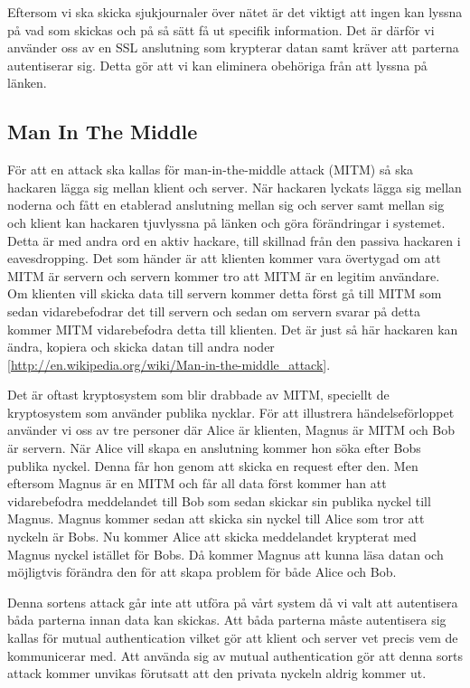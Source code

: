Eftersom vi ska skicka sjukjournaler över nätet är det viktigt att ingen kan lyssna på vad som skickas och på så sätt få ut specifik information. Det är därför vi använder oss av en SSL anslutning som krypterar datan samt kräver att parterna autentiserar sig. Detta gör att vi kan eliminera obehöriga från att lyssna på länken. 

\subsection{Man In The Middle}

För att en attack ska kallas för man-in-the-middle attack (MITM) så ska hackaren lägga sig mellan klient och server. När hackaren lyckats lägga sig mellan noderna och fått en etablerad anslutning mellan sig och server samt mellan sig och klient kan hackaren tjuvlyssna på länken och göra förändringar i systemet. Detta är med andra ord en aktiv hackare, till skillnad från den passiva hackaren i eavesdropping. Det som händer är att klienten kommer vara övertygad om att MITM är servern och servern kommer tro att MITM är en legitim användare. Om klienten vill skicka data till servern kommer detta först gå till MITM som sedan vidarebefodrar det till servern och sedan om servern svarar på detta kommer MITM vidarebefodra detta till klienten. Det är just så här hackaren kan ändra, kopiera och skicka datan till andra noder [\url{http://en.wikipedia.org/wiki/Man-in-the-middle_attack}].

Det är oftast kryptosystem som blir drabbade av MITM, speciellt de kryptosystem som använder publika nycklar. För att illustrera händelseförloppet använder vi oss av tre personer där Alice är klienten, Magnus är MITM och Bob är servern. När Alice vill skapa en anslutning kommer hon söka efter Bobs publika nyckel. Denna får hon genom att skicka en request efter den. Men eftersom Magnus är en MITM och får all data först kommer han att vidarebefodra meddelandet till Bob som sedan skickar sin publika nyckel till Magnus. Magnus kommer sedan att skicka sin nyckel till Alice som tror att nyckeln är Bobs. Nu kommer Alice att skicka meddelandet krypterat med Magnus nyckel istället för Bobs. Då kommer Magnus att kunna läsa datan och möjligtvis förändra den för att skapa problem för både Alice och Bob. 

Denna sortens attack går inte att utföra på vårt system då vi valt att autentisera båda parterna innan data kan skickas. Att båda parterna måste autentisera sig kallas för mutual authentication vilket gör att klient och server vet precis vem de kommunicerar med. Att använda sig av mutual authentication gör att denna sorts attack kommer unvikas förutsatt att den privata nyckeln aldrig kommer ut.

